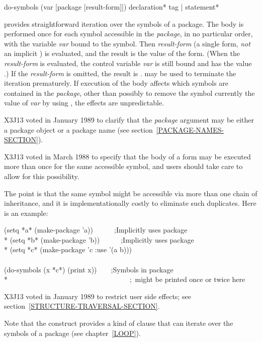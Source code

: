 \begin{defmac}
do-symbols (var [package [result-form]])
           {declaration}* {tag | statement}*

 provides straightforward iteration over the symbols of a
package.  The body is performed once for each symbol accessible in the
\emph{package}, in no particular order, with the variable \emph{var} bound to
the symbol.  Then \emph{result-form} (a single form, \emph{not} an implicit
) is evaluated, and the result is the value of the
 form.  (When the \emph{result-form} is evaluated, the control
variable \emph{var} is still bound and has the value {\false}.)  If the
\emph{result-form} is omitted, the result is {\false}.   may be used
to terminate the iteration prematurely.  If execution of the body affects
which symbols are contained in the \emph{package}, other than possibly to
remove the symbol currently the value of \emph{var} by using ,
the effects are unpredictable.

\begin{new}
X3J13 voted in January 1989
to clarify that the \emph{package} argument may be either a package object
or a package name (see section~\ref{PACKAGE-NAMES-SECTION}).
\end{new}

\begin{new}
X3J13 voted in March 1988
to specify that the body of a 
form may be executed more than once for the same accessible symbol, and users
should take care to allow for this possibility.

The point is that the same symbol might be accessible via more than one
chain of inheritance, and it is implementationally costly to eliminate
such duplicates.  Here is an example:
\begin{lisp}
(setq *a* (make-package 'a))~~~~~~;\textrm{Implicitly uses package } \\*
(setq *b* (make-package 'b))~~~~~~;\textrm{Implicitly uses package } \\*
(setq *c* (make-package 'c :use '(a b))) \\
\\
(do-symbols (x *c*) (print x))~~~~;\textrm{Symbols in package } \\*
~~~~~~~~~~~~~~~~~~~~~~~~~~~~~~~~~~;~\textrm{might be printed once or twice here}
\end{lisp}

X3J13 voted in January 1989
to restrict user side effects; see section~\ref{STRUCTURE-TRAVERSAL-SECTION}.
\end{new}
\begin{new}
Note that the  construct provides a kind of  clause that
can iterate over the symbols of a package (see chapter~\ref{LOOP}).
\end{new}
\end{defmac}

